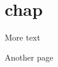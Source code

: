 \documentclass{book}
\newcommand{\Texinfothechapterheading}{}
\newcommand{\Texinfoheadingchaptername}{\chaptername}
\newcommand{\Texinfochapter}[1]{\chapter{#1}
\renewcommand{\Texinfothechapterheading}{\Texinfoheadingchaptername{} \thechapter{} }%
}%
\renewcommand{\_}{\Texinfounderscore\discretionary{}{}{}}
\begin{document}
\Texinfochapter{{chap}}
\label{anchor:chap}%

\newpage{}%
\phantom{blabla}%

More text

\newpage{}%
\phantom{blabla}%

Another page
\end{document}
